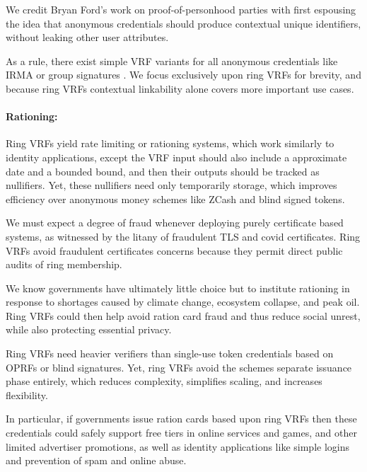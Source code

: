We credit Bryan Ford's work on proof-of-personhood parties \cite{pop2008,pop2017}
with first espousing the idea that anonymous credentials should produce
contextual unique identifiers, without leaking other user attributes.

As a rule, there exist simple VRF variants for all anonymous credentials
like IRMA \cite{IRMA_credentials} or group signatures \cite{group_sig_survey}.
We focus exclusively upon ring VRFs for brevity, and because ring VRFs
contextual linkability alone covers more important use cases.


\paragraph{Rationing:}

Ring VRFs yield rate limiting or rationing systems, which work
similarly to identity applications, except the VRF input should also
include a approximate date and a bounded bound, and
 then their outputs should be tracked as nullifiers.
Yet, these nullifiers need only temporarily storage, which improves 
efficiency over anonymous money schemes like ZCash and blind signed tokens.

We must expect a degree of fraud whenever deploying purely certificate
based systems, as witnessed by the litany of fraudulent TLS and covid
certificates.  Ring VRFs avoid fraudulent certificates concerns because
they permit direct public audits of ring membership.

We know governments have ultimately little choice but to institute
rationing in response to shortages caused by climate change, ecosystem
collapse, and peak oil.  Ring VRFs could then help avoid ration card
fraud and thus reduce social unrest, while also protecting essential privacy.

Ring VRFs need heavier verifiers than single-use token credentials
based on OPRFs \cite{PrivacyPass} or blind signatures.
Yet, ring VRFs avoid the schemes separate issuance phase entirely,
which reduces complexity, simplifies scaling, and increases flexibility.

In particular, if governments issue ration cards based upon ring VRFs
then these credentials could safely support free tiers in online services
and games, and other limited advertiser promotions, as well as identity
applications like simple logins and prevention of spam and online abuse.

